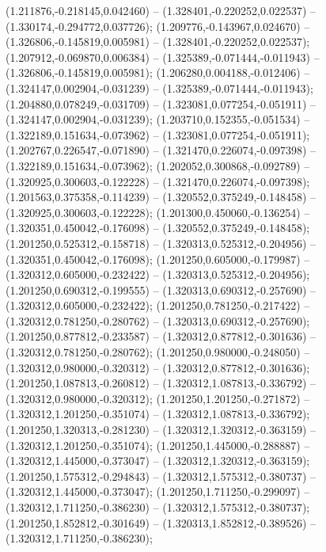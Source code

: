  (1.211876,-0.218145,0.042460) -- (1.328401,-0.220252,0.022537) -- (1.330174,-0.294772,0.037726);
 (1.209776,-0.143967,0.024670) -- (1.326806,-0.145819,0.005981) -- (1.328401,-0.220252,0.022537);
 (1.207912,-0.069870,0.006384) -- (1.325389,-0.071444,-0.011943) -- (1.326806,-0.145819,0.005981);
 (1.206280,0.004188,-0.012406) -- (1.324147,0.002904,-0.031239) -- (1.325389,-0.071444,-0.011943);
 (1.204880,0.078249,-0.031709) -- (1.323081,0.077254,-0.051911) -- (1.324147,0.002904,-0.031239);
 (1.203710,0.152355,-0.051534) -- (1.322189,0.151634,-0.073962) -- (1.323081,0.077254,-0.051911);
 (1.202767,0.226547,-0.071890) -- (1.321470,0.226074,-0.097398) -- (1.322189,0.151634,-0.073962);
 (1.202052,0.300868,-0.092789) -- (1.320925,0.300603,-0.122228) -- (1.321470,0.226074,-0.097398);
 (1.201563,0.375358,-0.114239) -- (1.320552,0.375249,-0.148458) -- (1.320925,0.300603,-0.122228);
 (1.201300,0.450060,-0.136254) -- (1.320351,0.450042,-0.176098) -- (1.320552,0.375249,-0.148458);
 (1.201250,0.525312,-0.158718) -- (1.320313,0.525312,-0.204956) -- (1.320351,0.450042,-0.176098);
 (1.201250,0.605000,-0.179987) -- (1.320312,0.605000,-0.232422) -- (1.320313,0.525312,-0.204956);
 (1.201250,0.690312,-0.199555) -- (1.320313,0.690312,-0.257690) -- (1.320312,0.605000,-0.232422);
 (1.201250,0.781250,-0.217422) -- (1.320312,0.781250,-0.280762) -- (1.320313,0.690312,-0.257690);
 (1.201250,0.877812,-0.233587) -- (1.320312,0.877812,-0.301636) -- (1.320312,0.781250,-0.280762);
 (1.201250,0.980000,-0.248050) -- (1.320312,0.980000,-0.320312) -- (1.320312,0.877812,-0.301636);
 (1.201250,1.087813,-0.260812) -- (1.320312,1.087813,-0.336792) -- (1.320312,0.980000,-0.320312);
 (1.201250,1.201250,-0.271872) -- (1.320312,1.201250,-0.351074) -- (1.320312,1.087813,-0.336792);
 (1.201250,1.320313,-0.281230) -- (1.320312,1.320312,-0.363159) -- (1.320312,1.201250,-0.351074);
 (1.201250,1.445000,-0.288887) -- (1.320312,1.445000,-0.373047) -- (1.320312,1.320312,-0.363159);
 (1.201250,1.575312,-0.294843) -- (1.320312,1.575312,-0.380737) -- (1.320312,1.445000,-0.373047);
 (1.201250,1.711250,-0.299097) -- (1.320312,1.711250,-0.386230) -- (1.320312,1.575312,-0.380737);
 (1.201250,1.852812,-0.301649) -- (1.320313,1.852812,-0.389526) -- (1.320312,1.711250,-0.386230);
